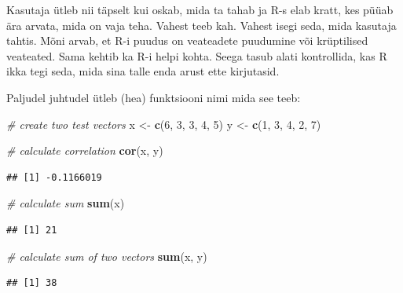 \documentclass[]{book}
\newenvironment{Shaded}{\begin{snugshade}}{\end{snugshade}}
\newcommand{\KeywordTok}[1]{\textcolor[rgb]{0.13,0.29,0.53}{\textbf{#1}}}
\newcommand{\DecValTok}[1]{\textcolor[rgb]{0.00,0.00,0.81}{#1}}
\newcommand{\StringTok}[1]{\textcolor[rgb]{0.31,0.60,0.02}{#1}}
\newcommand{\CommentTok}[1]{\textcolor[rgb]{0.56,0.35,0.01}{\textit{#1}}}
\newcommand{\NormalTok}[1]{#1}
\begin{document}
Kasutaja ütleb nii täpselt kui oskab, mida ta tahab ja R-s elab kratt,
kes püüab ära arvata, mida on vaja teha. Vahest teeb kah. Vahest isegi
seda, mida kasutaja tahtis. Mõni arvab, et R-i puudus on veateadete
puudumine või krüptilised veateated. Sama kehtib ka R-i helpi kohta.
Seega tasub alati kontrollida, kas R ikka tegi seda, mida sina talle
enda arust ette kirjutasid.

Paljudel juhtudel ütleb (hea) funktsiooni nimi mida see teeb:

\begin{Shaded}
\begin{Highlighting}[]
\CommentTok{# create two test vectors}
\NormalTok{x <-}\StringTok{ }\KeywordTok{c}\NormalTok{(}\DecValTok{6}\NormalTok{, }\DecValTok{3}\NormalTok{, }\DecValTok{3}\NormalTok{, }\DecValTok{4}\NormalTok{, }\DecValTok{5}\NormalTok{)}
\NormalTok{y <-}\StringTok{ }\KeywordTok{c}\NormalTok{(}\DecValTok{1}\NormalTok{, }\DecValTok{3}\NormalTok{, }\DecValTok{4}\NormalTok{, }\DecValTok{2}\NormalTok{, }\DecValTok{7}\NormalTok{)}
\end{Highlighting}
\end{Shaded}

\begin{Shaded}
\begin{Highlighting}[]
\CommentTok{# calculate correlation}
\KeywordTok{cor}\NormalTok{(x, y)}
\end{Highlighting}
\end{Shaded}

\begin{verbatim}
## [1] -0.1166019
\end{verbatim}

\begin{Shaded}
\begin{Highlighting}[]
\CommentTok{# calculate sum}
\KeywordTok{sum}\NormalTok{(x)}
\end{Highlighting}
\end{Shaded}

\begin{verbatim}
## [1] 21
\end{verbatim}

\begin{Shaded}
\begin{Highlighting}[]
\CommentTok{# calculate sum of two vectors}
\KeywordTok{sum}\NormalTok{(x, y)}
\end{Highlighting}
\end{Shaded}

\begin{verbatim}
## [1] 38
\end{verbatim}
\end{document}
